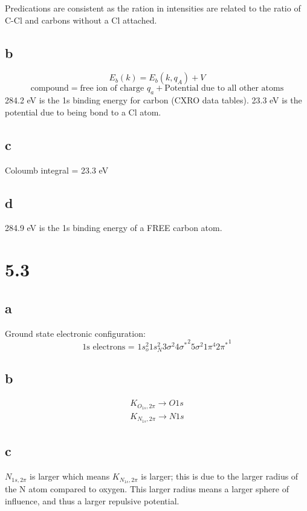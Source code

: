 \documentclass[12pt]{article}
\renewcommand{\=}[1]{\stackrel{#1}{=}} %
\theoremstyle{definition}
\theoremstyle{remark}
\begin{document}
Predications are consistent as the ration in intensities are related to the ratio of C-Cl and carbons without a Cl attached.

\subsection*{b}
\[
E_b(k) = E_b(k, q_A) + V
\]
\[
\text{compound} = \text{free ion of charge $q_a$} + \text{Potential due to all other atoms}
\]
284.2 eV is the 1s binding energy for carbon (CXRO data tables). 23.3 eV is the potential due to being bond to a Cl atom.

\subsection*{c}
Coloumb integral = 23.3 eV

\subsection*{d}
284.9 eV is the 1s binding energy of a FREE carbon atom.

\newpage
\section*{5.3}

\subsection*{a}
Ground state electronic configuration:
\[
\text{1s electrons = } 1s_o^2 1s_N^2 3\sigma^2 4{\sigma^*}^2 5\sigma^2 1\pi^4 2{\pi^*}^1
\]

\subsection*{b}
\begin{align*}
K_{O_{1s}, 2\pi} \to O1s\\[2mm]
K_{N_{1s}, 2\pi} \to N1s
\end{align*}

\subsection*{c}
$N_{1s,2\pi}$ is larger which means $K_{N_{1s}, 2\pi}$ is larger; this is due to the larger radius of the N atom compared to oxygen. This larger radius means a larger sphere of influence, and thus a larger repulsive potential.
\end{document}
